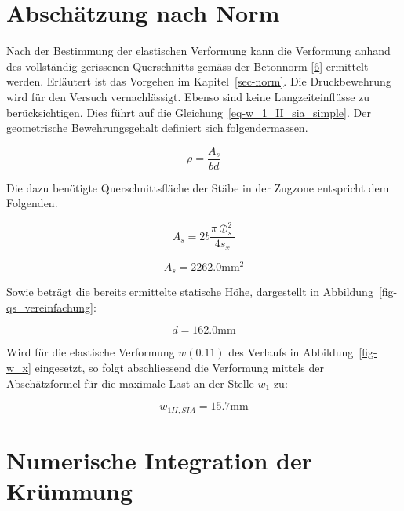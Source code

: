 \documentclass[
  12pt,
  letterpaper,
  egregdoesnotlikesansseriftitles]{scrreprt}
\begin{document}
\hypertarget{abschuxe4tzung-nach-norm}{%
\section{Abschätzung nach Norm}\label{abschuxe4tzung-nach-norm}}

Nach der Bestimmung der elastischen Verformung kann die Verformung
anhand des vollständig gerissenen Querschnitts gemäss der Betonnorm
{[}\protect\hyperlink{ref-SIA2013a}{6}{]} ermittelt werden. Erläutert
ist das Vorgehen im Kapitel~\ref{sec-norm}. Die Druckbewehrung wird für
den Versuch vernachlässigt. Ebenso sind keine Langzeiteinflüsse zu
berücksichtigen. Dies führt auf die
Gleichung~\ref{eq-w_1_II_sia_simple}. Der geometrische Bewehrungsgehalt
definiert sich folgendermassen.

\begin{equation}\rho = \frac{A_{s}}{b d}\end{equation}

Die dazu benötigte Querschnittsfläche der Stäbe in der Zugzone
entspricht dem Folgenden.

\begin{equation}A_{s} = 2 b \frac{\pi \oslash_{s}^{2}}{4 s_{x}}\end{equation}

\begin{equation}A_{s} = 2262.0 \text{mm}^{2}\end{equation}

Sowie beträgt die bereits ermittelte statische Höhe, dargestellt in
Abbildung~\ref{fig-qs_vereinfachung}:

\begin{equation}d = 162.0 \text{mm}\end{equation}

Wird für die elastische Verformung \(w(0.11)\) des Verlaufs in
Abbildung~\ref{fig-w_x} eingesetzt, so folgt abschliessend die
Verformung mittels der Abschätzformel für die maximale Last an der
Stelle \(w_1\) zu:

\begin{equation}w_{1 II,SIA} = 15.7 \text{mm}\end{equation}

\hypertarget{numerische-integration-der-kruxfcmmung}{%
\section{Numerische Integration der
Krümmung}\label{numerische-integration-der-kruxfcmmung}}
\end{document}
